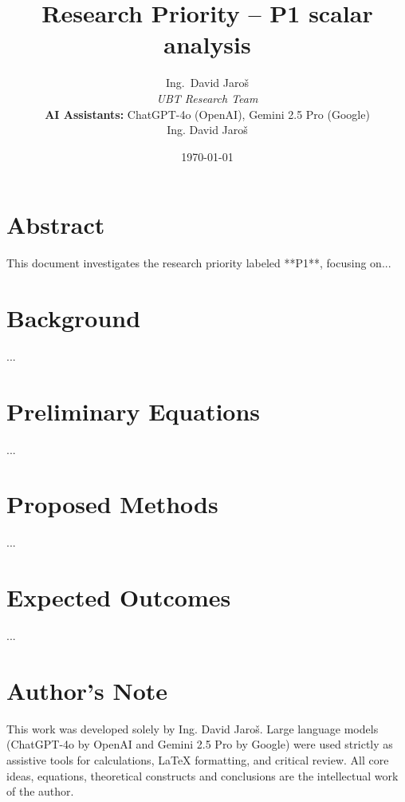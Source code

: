 \documentclass[12pt]{article}
\title{Research Priority – P1 scalar analysis}
\author{
Ing.~David Jaroš \\
\textit{UBT Research Team} \\
\textbf{AI Assistants:} ChatGPT-4o (OpenAI), Gemini 2.5 Pro (Google) \\
Ing. David Jaroš}
\date{\today}
\begin{document}
\maketitle

\section*{Abstract}
This document investigates the research priority labeled **P1**, focusing on...

\section*{Background}
...

\section*{Preliminary Equations}
...

\section*{Proposed Methods}
...

\section*{Expected Outcomes}
...


\section*{Author's Note}

This work was developed solely by Ing. David Jaroš.  
Large language models (ChatGPT-4o by OpenAI and Gemini 2.5 Pro by Google) were used strictly as assistive tools for calculations, LaTeX formatting, and critical review.  
All core ideas, equations, theoretical constructs and conclusions are the intellectual work of the author.
\end{document}
